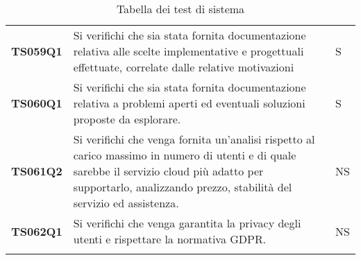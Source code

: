 \documentclass[../../piano-di-qualifica.tex]{subfiles}
\begin{document}
\begin{longtable}[H]{>{\centering\bfseries}m{3cm} >{}m{10cm} >{\centering\arraybackslash}m{3cm}}
  TS059Q1            & Si verifichi che sia stata fornita documentazione relativa alle scelte implementative e progettuali effettuate, correlate dalle relative motivazioni
                     & S                                                                                                                                                                                                                                                               \\                                                                                                                                                                                                                                                       

  TS060Q1            & Si verifichi che sia stata fornita documentazione relativa a problemi aperti ed eventuali soluzioni proposte da esplorare.
                     & S                                                                                                                                                                                                                                                               \\                                                                                                                                                                                                                                                       

  TS061Q2            & Si verifichi che venga fornita un'analisi rispetto al carico massimo in numero di utenti e di quale sarebbe il servizio cloud più adatto per supportarlo, analizzando prezzo, stabilità del servizio ed assistenza.
                     & NS                                                                                                                                                                                                                                                               \\

  TS062Q1            & Si verifichi che venga garantita la privacy degli utenti e rispettare la normativa GDPR\@.
                     & NS                                                                                                                                                                                                                                                               \\
  \rowcolor{white}
  \caption{Tabella dei test di sistema}%
  \label{tab:test_sistema}
\end{longtable}
\end{document}
